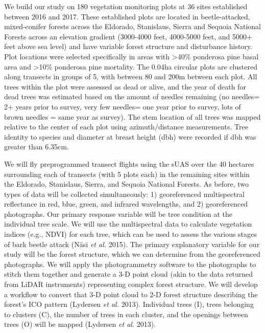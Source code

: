 \documentclass[]{article}
\begin{document}
We build our study on 180 vegetation monitoring plots at 36 sites
established between 2016 and 2017. These established plots are located
in beetle-attacked, mixed-conifer forests across the Eldorado,
Stanislaus, Sierra and Sequoia National Forests across an elevation
gradient (3000-4000 feet, 4000-5000 feet, and 5000+ feet above sea
level) and have variable forest structure and disturbance history. Plot
locations were selected specifically in areas with \textgreater{}40\%
ponderosa pine basal area and \textgreater{}10\% ponderosa pine
mortality. The 0.04ha circular plots are clustered along transects in
groups of 5, with between 80 and 200m between each plot. All trees
within the plot were assessed as dead or alive, and the year of death
for dead trees was estimated based on the amount of needles remaining
(no needles= 2+ years prior to survey, very few needles= one year prior
to survey, lots of brown needles = same year as survey). The stem
location of all trees was mapped relative to the center of each plot
using azimuth/distance measurements. Tree identity to species and
diameter at breast height (dbh) were recorded if dbh was greater than
6.35cm.

We will fly preprogrammed transect flights using the sUAS over the 40
hectares surrounding each of transects (with 5 plots each) in the
remaining sites within the Eldorado, Stanislaus, Sierra, and Sequoia
National Forests. As before, two types of data will be collected
simultaneously: 1) georeferenced multispectral reflectance in red, blue,
green, and infrared wavelengths, and 2) georeferenced photographs. Our
primary response variable will be tree condition at the individual tree
scale. We will use the multispectral data to calculate vegetation
indices (e.g., NDVI) for each tree, which can be used to assess the
various stages of bark beetle attack (Näsi \emph{et al.} 2015). The
primary explanatory variable for our study will be the forest structure,
which we can determine from the georeferenced photographs. We will apply
the photogrammetry software to the photographs to stitch them together
and generate a 3-D point cloud (akin to the data returned from LiDAR
instruments) representing complex forest structure. We will develop a
workflow to convert that 3-D point cloud to 2-D forest structure
describing the forest's ICO pattern (Lydersen \emph{et al.} 2013).
Individual trees (I), trees belonging to clusters (C), the number of
trees in each cluster, and the openings between trees (O) will be mapped
(Lydersen \emph{et al.} 2013).
\end{document}
